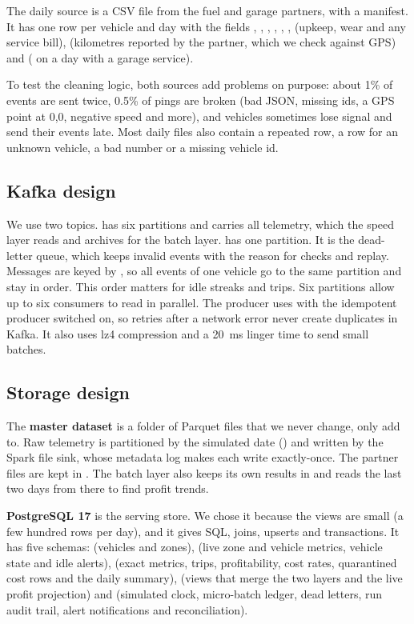 The daily source is a CSV file from the fuel and garage partners, with a manifest. It has one row per
vehicle and day with the fields , , ,
, , ,  (upkeep, wear and any
service bill),  (kilometres reported by the partner, which we check against GPS) and
 ( on a day with a garage service).

To test the cleaning logic, both sources add problems on purpose: about 1\% of events are sent twice,
0.5\% of pings are broken (bad JSON, missing ids, a GPS point at 0,0, negative speed and more), and
vehicles sometimes lose signal and send their events late. Most daily files also contain a repeated row, a
row for an unknown vehicle, a bad number or a missing vehicle id.

\subsection{Kafka design}
We use two topics.  has six partitions and carries all telemetry, which the speed
layer reads and archives for the batch layer.  has one partition. It is the
dead-letter queue, which keeps invalid events with the reason for checks and replay. Messages are keyed by
, so all events of one vehicle go to the same partition and stay in order. This order
matters for idle streaks and trips. Six partitions allow up to six consumers to read in parallel. The
producer uses  with the idempotent producer switched on, so retries after a network error never
create duplicates in Kafka. It also uses lz4 compression and a 20~ms linger time to send small batches.

\subsection{Storage design}
The \textbf{master dataset} is a folder of Parquet files that we never change, only add to. Raw telemetry is
partitioned by the simulated date () and written by the
Spark file sink, whose metadata log makes each write exactly-once. The partner files are kept in
. The batch layer also keeps its own results in  and reads the
last two days from there to find profit trends.

\textbf{PostgreSQL 17} is the serving store. We chose it because the views are small (a few hundred rows per
day), and it gives SQL, joins, upserts and transactions. It has five schemas:  (vehicles and zones),
 (live zone and vehicle metrics, vehicle state and idle alerts),  (exact metrics,
trips, profitability, cost rates, quarantined cost rows and the daily summary),  (views that
merge the two layers and the live profit projection) and  (simulated clock, micro-batch ledger,
dead letters, run audit trail, alert notifications and reconciliation).
